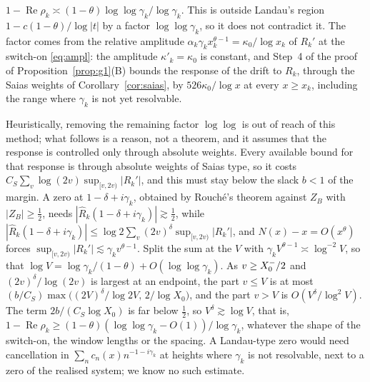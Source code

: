 \begin{remark}\label{rem:landau}
$1-\operatorname{Re}\rho_k\asymp(1-\theta)\log\log\gamma_k/\log\gamma_k$. This is outside Landau's region
$1-c(1-\theta)/\log|t|$ by a factor $\log\log\gamma_k$, so it does not contradict it. The factor comes from the relative amplitude
$\alpha_k\gamma_kx_k^{\theta-1}=\kappa_0/\log x_k$ of $R_k'$ at the switch-on \eqref{eq:ampl}: the amplitude $\kappa'_k=\kappa_0$ is
constant, and Step~4 of the proof of Proposition~\ref{prop:g1}(B) bounds the response of the drift to $R_k$, through the Saias
weights of Corollary~\ref{cor:saias}, by $526\kappa_0/\log x$ at every $x\ge x_k$, including the range where $\gamma_k$ is not
yet resolvable.

Heuristically, removing the remaining factor $\log\log$ is out of reach of this method; what follows is a reason, not a
theorem, and it assumes that the response is controlled only through absolute weights. Every available bound for that response is through
absolute weights of Saias type, so it costs $C_S\sum_v\log(2v)\sup_{[v,2v)}|R_k'|$, and this must stay below the slack $b<1$ of
the margin. A zero at $1-\delta+i\gamma_k$, obtained by Rouch\'e's theorem against $Z_B$ with $|Z_B|\ge\frac12$, needs
$|\widehat R_k(1-\delta+i\gamma_k)|\gtrsim\frac12$, while
$|\widehat R_k(1-\delta+i\gamma_k)|\le\log2\sum_v(2v)^{\delta}\sup_{[v,2v)}|R_k'|$, and $N(x)-x=O(x^\theta)$ forces
$\sup_{[v,2v)}|R_k'|\lesssim\gamma_kv^{\theta-1}$. Split the sum at the $V$ with $\gamma_kV^{\theta-1}\asymp\log^{-2}V$, so that
$\log V=\log\gamma_k/(1-\theta)+O(\log\log\gamma_k)$. As $v\ge X_0^{-}/2$ and $(2v)^{\delta}/\log(2v)$ is largest at an
endpoint, the part $v\le V$ is at most $(b/C_S)\max\bigl((2V)^{\delta}/\log2V,\,2/\log X_0\bigr)$, and the part $v>V$ is
$O(V^{\delta}/\log^2V)$. The term $2b/(C_S\log X_0)$ is far below $\frac12$, so $V^{\delta}\gtrsim\log V$, that is,
$1-\operatorname{Re}\rho_k\ge(1-\theta)(\log\log\gamma_k-O(1))/\log\gamma_k$, whatever the shape of the switch-on, the window
lengths or the spacing. A Landau-type zero would need cancellation in $\sum_nc_n(x)n^{-1-i\gamma_k}$ at heights where $\gamma_k$
is not resolvable, next to a zero of the realised system; we know no such estimate.
\end{remark}
\par\endgroup
